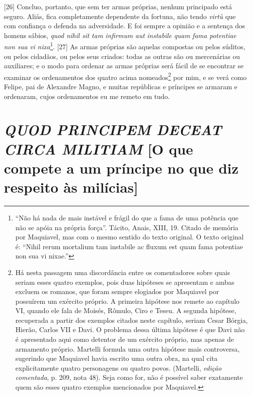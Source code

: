 {[}26{]} Concluo, portanto, que sem ter armas próprias, nenhum
principado está seguro. Aliás, fica completamente dependente da fortuna,
não tendo \emph{virtù} que com confiança o defenda na adversidade. E foi
sempre a opinião e a sentença dos homens sábios, \emph{quod nihil sit
tam infirmum aut instabile quam fama potentiae non sua vi
nixa}\footnote{``Não há nada de mais instável e frágil do que a fama de
  uma potência que não se apóia na própria força''. Tácito, Anais, XIII,
  19. Citado de memória por Maquiavel, mas com o mesmo sentido do texto
  original. O texto original é: ``Nihil rerum mortalium tam instabile ac
  fluxum est quam fama potentiae non sua vi nixae.''}. {[}27{]} As armas
próprias são aquelas compostas ou pelos súditos, ou pelos cidadãos, ou
pelos seus criados: todas as outras são ou mercenárias ou auxiliares; e
o modo para ordenar as armas próprias será fácil de se encontrar se
examinar os ordenamentos dos quatro acima nomeados\footnote{Há nesta
  passagem uma discordância entre os comentadores sobre quais seriam
  esses quatro exemplos, pois duas hipóteses se apresentam e ambas
  excluem os romanos, que foram sempre elogiados por Maquiavel por
  possuírem um exército próprio. A primeira hipótese nos remete ao
  capítulo VI, quando ele fala de Moisés, Rômulo, Ciro e Teseu. A
  segunda hipótese, recuperada a partir dos exemplos citados neste
  capítulo, seriam Cesar Bórgia, Hierão, Carlos VII e Davi. O problema
  dessa última hipótese é que Davi não é apresentado aqui como detentor
  de um exército próprio, mas apenas de armamento próprio. Martelli
  formula uma outra hipótese mais controversa, sugerindo que Maquiavel
  havia escrito uma outra obra, na qual cita explicitamente quatro
  personagens ou quatro povos. (Martelli, \emph{edição comentada}, p.
  209, nota 48). Seja como for, não é possível saber exatamente quem são
  esses quatro exemplos mencionados por Maquiavel.} por mim, e se verá
como Felipe, pai de Alexandre Magno, e muitas repúblicas e príncipes se
armaram e ordenaram, cujos ordenamentos eu me remeto em tudo.

\quebra\section{\emph{QUOD PRINCIPEM DECEAT CIRCA MILITIAM}
{[}O que compete a um príncipe no que diz respeito às milícias{]}}

